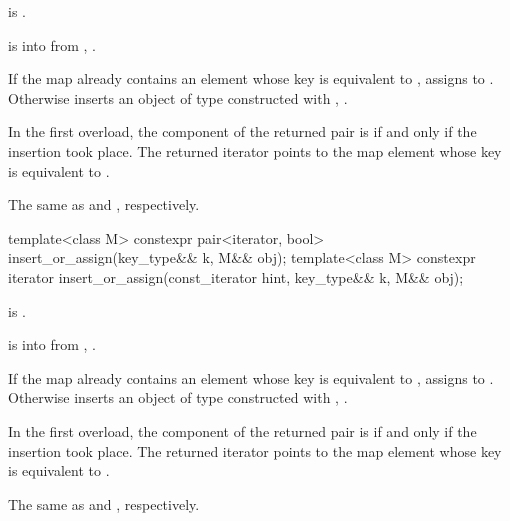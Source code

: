 \begin{itemdescr}
\pnum
\mandates
{} is .

\pnum
\expects
{} is  into 
from , .

\pnum
\effects
If the map already contains an element 
whose key is equivalent to ,
assigns  to .
Otherwise inserts an object of type 
constructed with , .

\pnum
\returns
In the first overload,
the  component of the returned pair is 
if and only if the insertion took place.
The returned iterator points to the map element
whose key is equivalent to .

\pnum
\complexity
The same as  and ,
respectively.
\end{itemdescr}

%
\begin{itemdecl}
template<class M>
  constexpr pair<iterator, bool> insert_or_assign(key_type&& k, M&& obj);
template<class M>
  constexpr iterator insert_or_assign(const_iterator hint, key_type&& k, M&& obj);
\end{itemdecl}

\begin{itemdescr}
\pnum
\mandates
{} is .

\pnum
\expects
{} is  into 
from , .

\pnum
\effects
If the map already contains an element 
whose key is equivalent to ,
assigns  to .
Otherwise inserts an object of type 
constructed with , .

\pnum
\returns
In the first overload,
the  component of the returned pair is 
if and only if the insertion took place.
The returned iterator points to the map element
whose key is equivalent to .

\pnum
\complexity
The same as  and ,
respectively.
\end{itemdescr}

